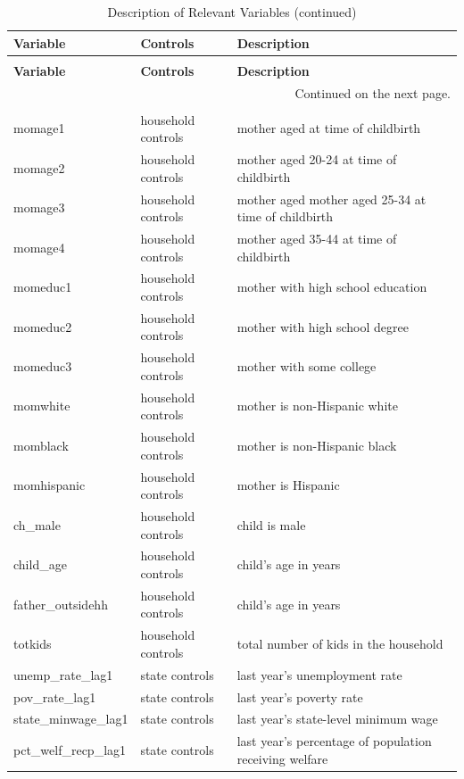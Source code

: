 \documentclass[11pt,a4paper]{article}
\begin{document}
\begin{longtable}{l|l|p{6cm}}
\caption{Description of Relevant Variables} \\
\hline
\textbf{Variable} & \textbf{Controls} & \textbf{Description}    \\
\hline
\endfirsthead %
\caption{Description of Relevant Variables (continued)}\\
\hline
\textbf{Variable} & \textbf{Controls} & \textbf{Description}    \\
\hline
\endhead %
\multicolumn{3}{r}{Continued on the next page.}\\
\endfoot
\hline
\multicolumn{3}{r}{End of table.} \\
\endlastfoot
momage1 & household controls & mother aged \<20 at time of childbirth \\
momage2 & household controls & mother aged 20-24 at time of childbirth \\
momage3 & household controls & mother aged mother aged 25-34 at time of childbirth \\
momage4 & household controls & mother aged 35-44 at time of childbirth \\
momeduc1 & household controls & mother with \< high school education \\
momeduc2 & household controls & mother with high school degree \\
momeduc3 & household controls & mother with some college \\
momwhite & household controls & mother is non-Hispanic white \\
momblack & household controls & mother is non-Hispanic black \\
momhispanic & household controls & mother is Hispanic \\
ch\_male & household controls & child is male \\
child\_age & household controls & child's age in years \\
father\_outsidehh & household controls & child's age in years \\
totkids & household controls & total number of kids in the household \\
\hline 



unemp\_rate\_lag1 & state controls & last year's unemployment rate \\
pov\_rate\_lag1 & state controls & last year's poverty rate \\
state\_minwage\_lag1 & state controls & last year's state-level minimum wage \\
pct\_welf\_recp\_lag1 & state controls & last year's percentage of population receiving welfare \\
\hline





\end{longtable}
\end{document}
